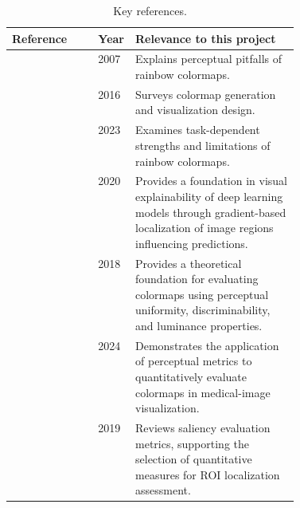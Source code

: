 \documentclass[11pt]{article}
\begin{document}
\begin{table}[htbp]
\centering
\caption{Key references.}
\label{tab:refs}

\begin{tabularx}{\textwidth}{
    @{}
    p{0.30\linewidth}
    p{0.12\linewidth}
    X
    @{}
}
\toprule
\textbf{Reference} &
\textbf{Year} &
\textbf{Relevance to this project} \\
\midrule

\citep{borland2007rainbow} & 2007 &
Explains perceptual pitfalls of rainbow colormaps. \\

\citep{zhou2016survey} & 2016 &
Surveys colormap generation and visualization design. \\

\citep{ware2023rainbow} & 2023 &
Examines task-dependent strengths and limitations of rainbow colormaps. \\

\citep{Selvaraju2020GradCAM} & 2020 & Provides a foundation in visual explainability of deep learning models through gradient-based localization of image regions influencing predictions. \\

\citep{bujack2018colormaps} & 2018 &
Provides a theoretical foundation for evaluating colormaps using perceptual uniformity, discriminability, and luminance properties. \\

\citep{qutbi2024colormaps} & 2024 &
    Demonstrates the application of perceptual metrics to quantitatively evaluate colormaps in medical-image visualization.\\

\citep{bylinskii2019saliency} & 2019 &
Reviews saliency evaluation metrics, supporting the selection of quantitative measures for ROI localization assessment. \\

\bottomrule
\end{tabularx}
\end{table}
\end{document}
